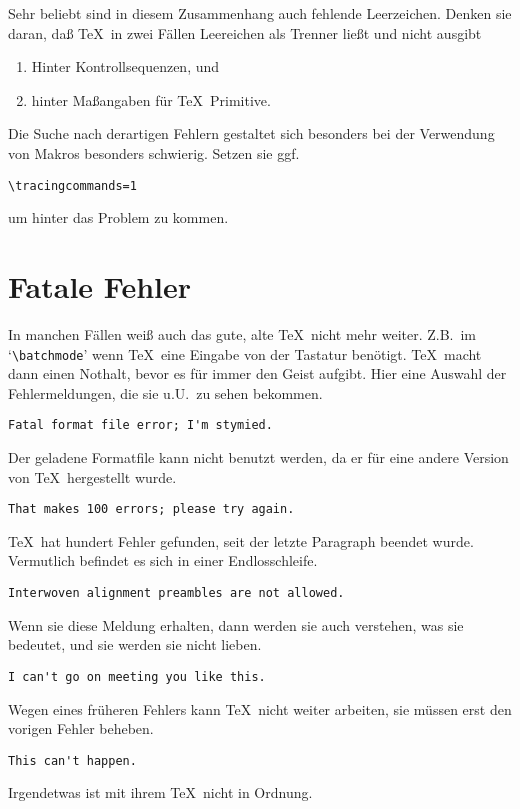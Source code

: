 Sehr beliebt sind in diesem Zusammenhang auch fehlende
Leerzeichen.
Denken sie daran, da\ss{} \TeX\ in zwei F\"allen Leereichen als Trenner
lie\ss{}t und nicht ausgibt
\begin{enumerate}
\item Hinter Kontrollsequenzen, und
\item hinter Ma\ss{}angaben f\"ur \TeX\ Primitive.
\end{enumerate}
Die Suche nach derartigen Fehlern gestaltet sich besonders bei der
Verwendung von 
Makros besonders schwierig. Setzen sie ggf.
\begin{verbatim}
\tracingcommands=1
\end{verbatim}
um hinter das Problem zu kommen.
\section{Fatale Fehler}
In manchen F\"allen wei\ss{} auch das gute, alte \TeX\ nicht mehr weiter.
Z.B.\ im 
`\verb|\batchmode|' wenn \TeX\ eine 
Eingabe
von der Tastatur ben\"otigt. \TeX\ macht dann einen 
Nothalt, bevor es
f\"ur immer den Geist aufgibt. Hier eine Auswahl der Fehlermeldungen,
die sie u.U.\ zu sehen bekommen.
\begin{verbatim}
Fatal format file error; I'm stymied.
\end{verbatim}
Der geladene Formatfile kann nicht benutzt werden, da er f\"ur eine
andere Version von \TeX\ hergestellt wurde.
\begin{verbatim}
That makes 100 errors; please try again.
\end{verbatim}
\TeX\ hat hundert Fehler gefunden, seit der letzte Paragraph beendet
wurde. Vermutlich befindet es sich in einer
Endlosschleife.
\begin{verbatim}
Interwoven alignment preambles are not allowed.
\end{verbatim}
Wenn sie diese Meldung erhalten, dann werden sie auch verstehen, was
sie bedeutet, und sie werden sie nicht lieben.
\begin{verbatim}
I can't go on meeting you like this.
\end{verbatim}
Wegen eines fr\"uheren Fehlers kann \TeX\ nicht weiter arbeiten, sie
m\"ussen erst den vorigen Fehler beheben.
\begin{verbatim}
This can't happen.
\end{verbatim}
Irgendetwas ist mit ihrem \TeX\ nicht in Ordnung.
